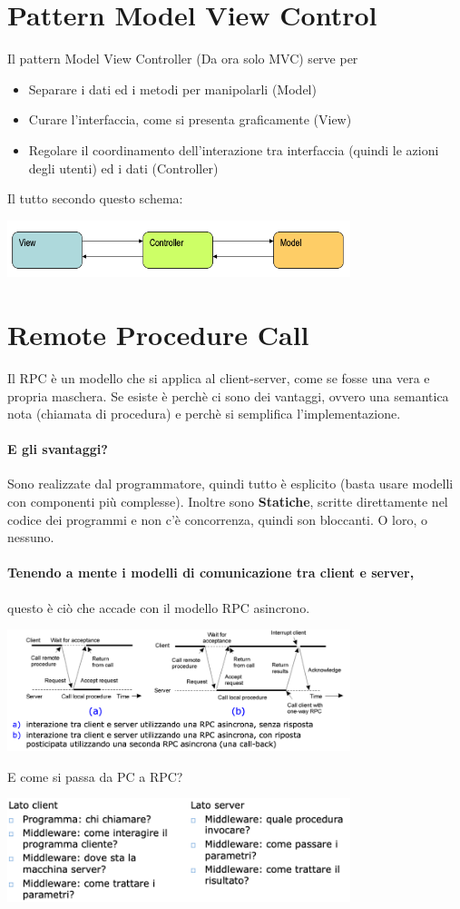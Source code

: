 \documentclass[12pt, a4paper, openany, twoside]{book}
\begin{document}
\section{Pattern Model View Control}
Il pattern Model View Controller (Da ora solo MVC) serve per
\begin{itemize}
	\item Separare i dati ed i metodi per manipolarli (Model)
	\item Curare l'interfaccia, come si presenta graficamente (View)
	\item Regolare il coordinamento dell'interazione tra interfaccia (quindi
	le azioni degli utenti) ed i dati (Controller)
\end{itemize}
Il tutto secondo questo schema:
\begin{center}
\includegraphics[width=0.75\textwidth]{16}
\end{center}
\section{Remote Procedure Call}
Il RPC è un modello che si applica al client-server, come se fosse una vera
e propria maschera. Se esiste è perchè ci sono dei vantaggi, ovvero una
semantica nota (chiamata di procedura) e perchè si semplifica l'implementazione.
\paragraph{E gli svantaggi?} Sono realizzate dal programmatore, quindi tutto
è esplicito (basta usare modelli con componenti più complesse). Inoltre sono 
\textbf{Statiche}, scritte direttamente nel codice dei programmi e non c'è
concorrenza, quindi son bloccanti. O loro, o nessuno. 
\paragraph{Tenendo a mente i modelli di comunicazione tra client e server,}
questo è ciò che accade con il modello RPC asincrono. 
\begin{center}
\includegraphics[width=0.75\textwidth]{17}
\end{center}
E come si passa da PC a RPC?
\begin{center}
\includegraphics[width=0.75\textwidth]{18}
\end{center}
\end{document}
